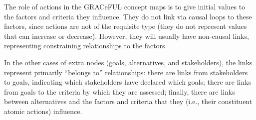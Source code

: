 The role of actions in the GRACeFUL concept maps is to give initial
values to the factors and criteria they influence. They do not link via
causal loops to these factors, since actions are not of the requisite
type (they do not represent values that can increase or decrease).
However, they will usually have non-causal links, representing
constraining relationships to the factors.

In the other cases of extra nodes (goals, alternatives, and
stakeholders), the links represent primarily ``belongs to''
relationships: there are links from stakeholders to goals, indicating
which stakeholders have declared which goals; there are links from goals
to the criteria by which they are assessed; finally, there are links
between alternatives and the factors and criteria that they (i.e., their
constituent atomic actions) influence.
